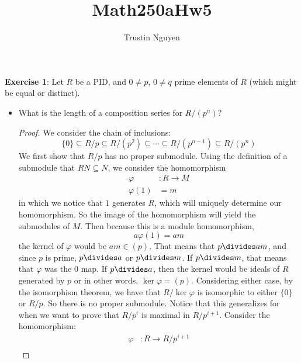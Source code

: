 \documentclass{article}
\title{Math250aHw5}
\author{Trustin Nguyen}
\begin{document}
    \maketitle

\reversemarginpar

\textbf{Exercise 1}: Let $R$ be a PID, and $0 \neq p$, $0 \neq q$ prime elements of $R$ (which might be equal or distinct).
    \begin{itemize}
        \item What is the length of a composition series for $R/(p^{n})$?
            \begin{proof}
                We consider the chain of inclusions: 
                    \begin{equation*}
                        \{0\} \subseteq R/p \subseteq R/(p^{2}) \subseteq \cdots \subseteq R/(p^{n - 1}) \subseteq R/(p^{n})
                    \end{equation*}
                We first show that $R/p$ has no proper submodule. Using the definition of a submodule that $RN \subseteq N$, we consider the homomorphism 
                    \begin{align*}
                        \varphi    &: R \rightarrow M \\
                        \varphi(1) &= m                 
                    \end{align*}
                in which we notice that $1$ generates $R$, which will uniquely determine our homomorphism. So the image of the homomorphism will yield the submodules of $M$. Then because this is a module homomorphism,
                    \begin{equation*}
                        a\varphi(1) = am
                    \end{equation*}
                the kernel of $\varphi$ would be $am \in (p)$. That means that $p \divides am$, and since $p$ is prime, $p \divides a$ or $p \divides m$. If $p \divides m$, that means that $\varphi$ was the $0$ map. If $p \divides a$, then the kernel would be ideals of $R$ generated by $p$ or in other words, $\ker{\varphi} = (p)$. Considering either case, by the isomorphism theorem, we have that $R/\ker{\varphi}$ is isomorphic to either $\{0\}$ or $R/p$. So there is no proper submodule. Notice that this generalizes for when we want to prove that $R/p^{i}$ is maximal in $R/p^{i + 1}$. Consider the homomorphism:
                    \begin{align*}
                        \varphi    &: R \rightarrow R/p^{i + 1} \\

\end{align*}
\end{proof}
\end{itemize}
\end{document}
